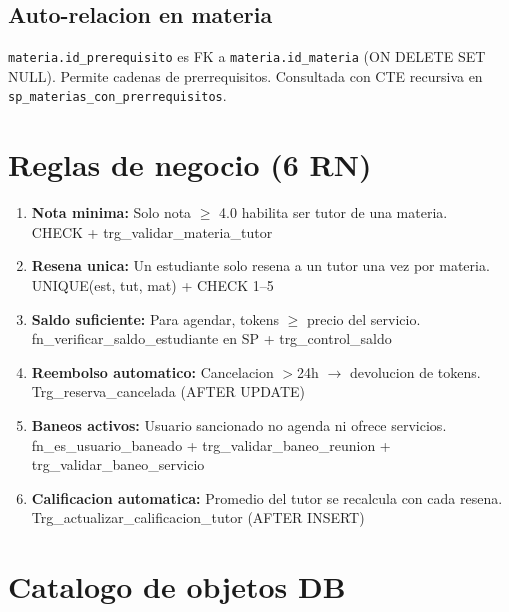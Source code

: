 \documentclass[10pt,a4paper]{article}
\begin{document}
\subsection{Auto-relacion en materia}
\texttt{materia.id\_prerequisito} es FK a \texttt{materia.id\_materia} (ON DELETE SET NULL). Permite cadenas de prerrequisitos. Consultada con CTE recursiva en \texttt{sp\_materias\_con\_prerrequisitos}.

\section{Reglas de negocio (6 RN)}
\begin{enumerate}[leftmargin=*, label=\textbf{RN-\arabic*:}]
    \item \textbf{Nota minima:} Solo nota $\geq$ 4.0 habilita ser tutor de una materia. \\ {\small CHECK + trg\_validar\_materia\_tutor}
    \item \textbf{Resena unica:} Un estudiante solo resena a un tutor una vez por materia. \\ {\small UNIQUE(est, tut, mat) + CHECK 1--5}
    \item \textbf{Saldo suficiente:} Para agendar, tokens $\geq$ precio del servicio. \\ {\small fn\_verificar\_saldo\_estudiante en SP + trg\_control\_saldo}
    \item \textbf{Reembolso automatico:} Cancelacion $>$24h $\rightarrow$ devolucion de tokens. \\ {\small Trg\_reserva\_cancelada (AFTER UPDATE)}
    \item \textbf{Baneos activos:} Usuario sancionado no agenda ni ofrece servicios. \\ {\small fn\_es\_usuario\_baneado + trg\_validar\_baneo\_reunion + trg\_validar\_baneo\_servicio}
    \item \textbf{Calificacion automatica:} Promedio del tutor se recalcula con cada resena. \\ {\small Trg\_actualizar\_calificacion\_tutor (AFTER INSERT)}
\end{enumerate}

\section{Catalogo de objetos DB}
\end{document}
